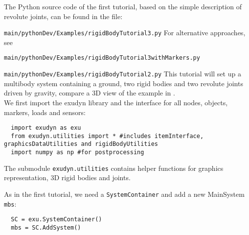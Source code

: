 \newpage
{}
The Python source code of the first tutorial, based on the simple description of revolute joints, can be found in the file:
\bi
  \item[] \texttt{main/pythonDev/Examples/rigidBodyTutorial3.py}
\ei
For alternative approaches, see
\bi
  \item[] \texttt{main/pythonDev/Examples/rigidBodyTutorial3withMarkers.py}
  \item[] \texttt{main/pythonDev/Examples/rigidBodyTutorial2.py}
\ei
This tutorial will set up a multibody system containing a ground, two rigid bodies and two revolute joints driven by gravity, compare a 3D view of the example in .
%
%
%
%
\horizontalRuler\\
\noindent We first import the exudyn library and the interface for all nodes, objects, markers, loads and sensors:
\pythonstyle\begin{lstlisting}
  import exudyn as exu
  from exudyn.utilities import * #includes itemInterface, graphicsDataUtilities and rigidBodyUtilities
  import numpy as np #for postprocessing
\end{lstlisting}
The submodule \texttt{exudyn.utilities} contains helper functions for graphics representation, 3D rigid bodies and joints.

\noindent As in the first tutorial, we need a \texttt{SystemContainer} and add a new MainSystem \texttt{mbs}:
\pythonstyle\begin{lstlisting}
  SC = exu.SystemContainer()
  mbs = SC.AddSystem()
\end{lstlisting}

